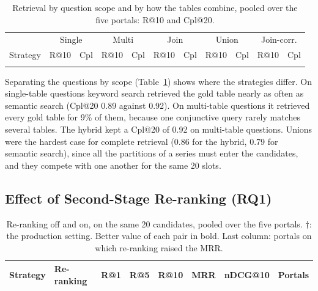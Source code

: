 \begin{table}[t]
\caption{Retrieval by question scope and by how the tables combine, pooled
over the five portals: R@10 and Cpl@20.}
\label{tab:scope}
\centering
\small
\setlength{\tabcolsep}{3.5pt}
\begin{tabular}{l|cc|cc|cc|cc|cc}
\hline
 & \multicolumn{2}{c|}{Single} & \multicolumn{2}{c|}{Multi} & \multicolumn{2}{c|}{Join} & \multicolumn{2}{c|}{Union} & \multicolumn{2}{c}{Join-corr.} \\
Strategy & R@10 & Cpl & R@10 & Cpl & R@10 & Cpl & R@10 & Cpl & R@10 & Cpl \\
\hline
 & %
\hline
\hline
\end{tabular}
\end{table}

Separating the questions by scope (Table~\ref{tab:scope}) shows where the
strategies differ. On single-table questions keyword search retrieved the gold
table nearly as often as semantic search (Cpl@20 0.89 against 0.92). On multi-table questions it
retrieved every gold table for 9\% of them, because one conjunctive query
rarely matches several tables. The hybrid kept a Cpl@20 of 0.92 on
multi-table questions. Unions were the hardest case for complete retrieval
(0.86 for the hybrid, 0.79 for semantic search), since all the partitions of
a series must enter the candidates, and they compete with one another for the
same 20 slots.

\subsection{Effect of Second-Stage Re-ranking (RQ1)}
\label{sec:results-rerank}

\begin{table}[t]
\caption{Re-ranking off and on, on the same 20 candidates, pooled over the five
portals. $\dagger$: the production setting. Better value of each pair in bold.
Last column: portals on which re-ranking raised the MRR.}
\label{tab:rerank}
\centering
\small
\begin{tabular}{ll|ccc|cc|c}
\hline
Strategy & Re-ranking & R@1 & R@5 & R@10 & MRR & nDCG@10 & Portals \\
\hline
\end{tabular}
\end{table}

